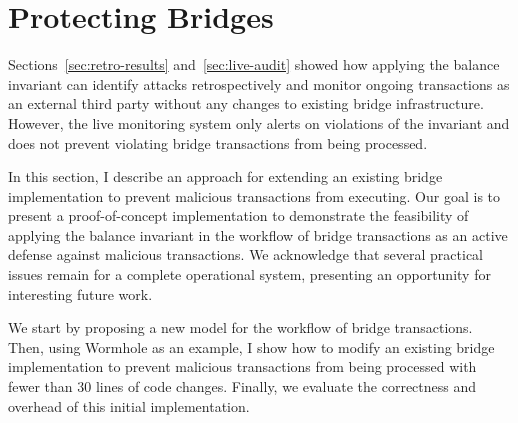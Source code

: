 \section{Protecting Bridges}
\label{sec:active-protect}

Sections~\ref{sec:retro-results} and~\ref{sec:live-audit} showed how
applying the balance invariant can identify attacks retrospectively and
monitor ongoing transactions as an external third party without any
changes to existing bridge infrastructure.  However, the live
monitoring system only alerts on violations of the invariant and does
not prevent violating bridge transactions from being processed.

In this section, I describe an approach for extending an existing
bridge implementation to prevent malicious transactions from
executing.  Our goal is to present a proof-of-concept implementation
to demonstrate the feasibility of applying the balance invariant in the
workflow of bridge transactions as an active defense against malicious
transactions.  We acknowledge that several practical issues remain
for a complete operational system, presenting an opportunity for
interesting future work.




We start by proposing a new model for the workflow of bridge
transactions.  Then, using Wormhole as an example, I show how to
modify an existing bridge implementation to prevent malicious transactions from
being processed with fewer than 30 lines of code changes.  Finally, we
evaluate the correctness and overhead of this initial implementation.

